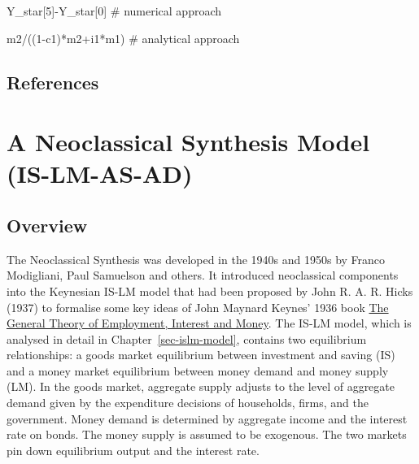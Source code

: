 \documentclass[
  letterpaper,
  DIV=11,
  numbers=noendperiod]{scrreprt}
\newenvironment{Shaded}{\begin{snugshade}}{\end{snugshade}}
\newcommand{\CommentTok}[1]{\textcolor[rgb]{0.37,0.37,0.37}{#1}}
\newcommand{\DecValTok}[1]{\textcolor[rgb]{0.68,0.00,0.00}{#1}}
\newcommand{\NormalTok}[1]{\textcolor[rgb]{0.00,0.23,0.31}{#1}}
\newcommand{\OperatorTok}[1]{\textcolor[rgb]{0.37,0.37,0.37}{#1}}
\begin{document}
\begin{tcolorbox}[enhanced jigsaw, titlerule=0mm, breakable, bottomrule=.15mm, toprule=.15mm, colbacktitle=quarto-callout-note-color!10!white, rightrule=.15mm, toptitle=1mm, opacityback=0, left=2mm, coltitle=black, title=\textcolor{quarto-callout-note-color}{\faInfo}\hspace{0.5em}{Python code}, colframe=quarto-callout-note-color-frame, opacitybacktitle=0.6, leftrule=.75mm, bottomtitle=1mm, arc=.35mm, colback=white]

\begin{Shaded}
\begin{Highlighting}[]
\NormalTok{Y\_star[}\DecValTok{5}\NormalTok{]}\OperatorTok{{-}}\NormalTok{Y\_star[}\DecValTok{0}\NormalTok{] }\CommentTok{\# numerical approach}

\NormalTok{m2}\OperatorTok{/}\NormalTok{((}\DecValTok{1}\OperatorTok{{-}}\NormalTok{c1)}\OperatorTok{*}\NormalTok{m2}\OperatorTok{+}\NormalTok{i1}\OperatorTok{*}\NormalTok{m1) }\CommentTok{\# analytical approach}
\end{Highlighting}
\end{Shaded}

\end{tcolorbox}

\section*{References}\label{references-2}


\chapter{A Neoclassical Synthesis Model
(IS-LM-AS-AD)}\label{sec-neoclassical-synthesis}

\section{Overview}\label{overview-2}

The Neoclassical Synthesis was developed in the 1940s and 1950s by
Franco Modigliani, Paul Samuelson and others. It introduced neoclassical
components into the Keynesian IS-LM model that had been proposed by John
R. A. R. Hicks (1937) to formalise some key ideas of John Maynard
Keynes' 1936 book
\href{https://en.wikipedia.org/wiki/The_General_Theory_of_Employment,_Interest_and_Money}{The
General Theory of Employment, Interest and Money}. The IS-LM model,
which is analysed in detail in Chapter~\ref{sec-islm-model}, contains
two equilibrium relationships: a goods market equilibrium between
investment and saving (IS) and a money market equilibrium between money
demand and money supply (LM). In the goods market, aggregate supply
adjusts to the level of aggregate demand given by the expenditure
decisions of households, firms, and the government. Money demand is
determined by aggregate income and the interest rate on bonds. The money
supply is assumed to be exogenous. The two markets pin down equilibrium
output and the interest rate.
\end{document}
